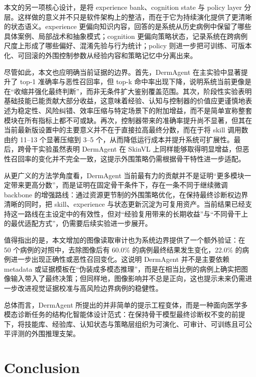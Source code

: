 \documentclass{article}
\begin{document}
本文的另一项核心设计，是将 experience bank、cognition state 与 policy layer 分层。这样做的意义并不只是软件架构上的整洁，而在于它为持续演化提供了更清晰的状态语义。experience 更偏向知识内容，回答的是系统从历史病例中保留了哪些具体案例、局部战术和抽象模式；cognition 更偏向策略状态，记录系统在跨病例尺度上形成了哪些偏好、混淆先验与行为统计；policy 则进一步把可训练、可版本化、可回滚的外围控制参数从经验内容和策略记忆中分离出来。

尽管如此，本文也应明确当前证据的边界。首先，DermAgent 在主实验中显著提升了 top-1 准确率与恶性召回率，但 top-k 命中率出现下降，说明系统当前更像是在“收缩并强化最终判断”，而非无条件扩大鉴别覆盖范围。其次，阶段性实验表明基础技能已能贡献大部分收益，这意味着经验、认知与控制器的价值应更谨慎地表述为稳定性、风险纠错、效率压缩与特定场景下的附加增益，而不是简单宣称整套模块在所有指标上都不可或缺。再次，控制器带来的准确率提升尚不显著，但其在当前最新版设置中的主要意义并不在于直接拉高最终分数，而在于将 skill 调用数由约 11--13 个显著压缩到 3--5 个，从而降低运行成本并提升系统可扩展性。最后，跨骨干实验虽然表明 DermAgent 在 SkinVL 上同样能够取得明显增益，但恶性召回率的变化并不完全一致，这提示外围策略仍需根据骨干特性进一步适配。

从更广义的方法学角度看，DermAgent 当前最有力的贡献并不是证明“更多模块一定带来更高分数”，而是证明在固定骨干条件下，存在一条不同于继续微调 backbone 的增强路线：通过资源更节制的外围策略优化，在保持最终诊断权边界清晰的同时，把 skill、experience 与状态更新沉淀为可复用资产。当前结果已经支持这一路线在主设定中的有效性，但对“经验复用带来的长期收益”与“不同骨干上的最优适配方式”，仍需要后续实验进一步展开。

值得指出的是，本文增加的图像读取审计也为系统边界提供了一个额外验证：在 50 个病例的对照中，去除图像后有 60.0\% 的病例最终结果发生变化，22.0\% 的病例进一步出现正确性或恶性召回变化。这说明 DermAgent 并不是主要依赖 metadata 或证据模板在“伪装成多模态推理”，而是在相当比例的病例上确实把图像输入带入了最终决策；但同样地，图像影响并不总是正向，这也提示未来仍需进一步改进视觉证据校准与高风险边界病例的稳健性。

总体而言，DermAgent 所提出的并非简单的提示工程变体，而是一种面向医学多模态诊断任务的结构化智能体设计范式：在保持骨干模型最终诊断权不变的前提下，将技能库、经验库、认知状态与策略层组织为可演化、可审计、可训练且可公平评测的外围推理支架。

\section{Conclusion}
\end{document}
